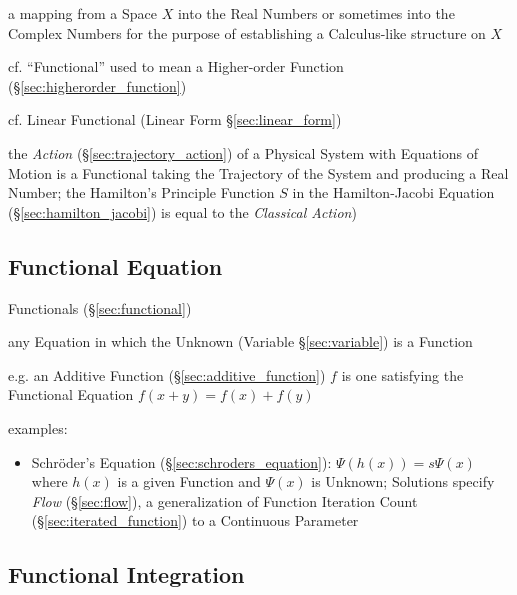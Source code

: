a mapping from a Space $X$ into the Real Numbers or sometimes into the Complex
Numbers for the purpose of establishing a Calculus-like structure on $X$

\fist cf. ``Functional'' used to mean a Higher-order Function
(\S\ref{sec:higherorder_function})

\fist cf. Linear Functional (Linear Form \S\ref{sec:linear_form})

the \emph{Action} (\S\ref{sec:trajectory_action}) of a Physical System with
Equations of Motion is a Functional taking the Trajectory of the System and
producing a Real Number; the Hamilton's Principle Function $S$ in the
Hamilton-Jacobi Equation (\S\ref{sec:hamilton_jacobi}) is equal to the
\emph{Classical Action})



\subsection{Functional Equation}\label{sec:functional_equation}


Functionals (\S\ref{sec:functional})

any Equation in which the Unknown (Variable \S\ref{sec:variable}) is a Function

e.g. an Additive Function (\S\ref{sec:additive_function}) $f$ is one satisfying
the Functional Equation $f(x + y) = f(x) + f(y)$


examples:
\begin{itemize}
  \item Schr\"oder's Equation (\S\ref{sec:schroders_equation}): $\Psi(h(x)) =
    s\Psi(x)$ where $h(x)$ is a given Function and $\Psi(x)$ is Unknown;
    Solutions specify \emph{Flow} (\S\ref{sec:flow}), a generalization of
    Function Iteration Count (\S\ref{sec:iterated_function}) to a Continuous
    Parameter
\end{itemize}



\subsection{Functional Integration}\label{sec:functional_integration}

